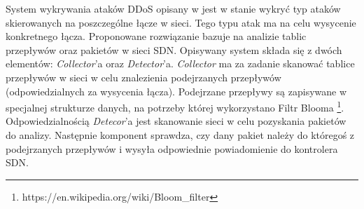 System wykrywania ataków DDoS opisany w \cite{bloomarticle} jest w stanie wykryć
typ ataków skierowanych na poszczególne łącze w sieci. Tego typu atak ma na celu
wysycenie konkretnego łącza. Proponowane rozwiązanie bazuje na analizie tablic
przepływów oraz pakietów w sieci SDN. Opisywany system składa się z dwóch
elementów: \textit{Collector}'a oraz \textit{Detector}'a. \textit{Collector} ma
za zadanie skanować tablice przepływów w sieci w celu znalezienia podejrzanych
przepływów (odpowiedzialnych za wysycenia łącza). Podejrzane przepływy są
zapisywane w specjalnej strukturze danych, na potrzeby której wykorzystano Filtr
Blooma \footnote{https://en.wikipedia.org/wiki/Bloom\_filter}.
Odpowiedzialnością \textit{Detecor}'a jest skanowanie sieci w celu pozyskania
pakietów do analizy. Następnie komponent sprawdza, czy dany pakiet należy do
któregoś z podejrzanych przepływów i wysyła odpowiednie powiadomienie do
kontrolera SDN.